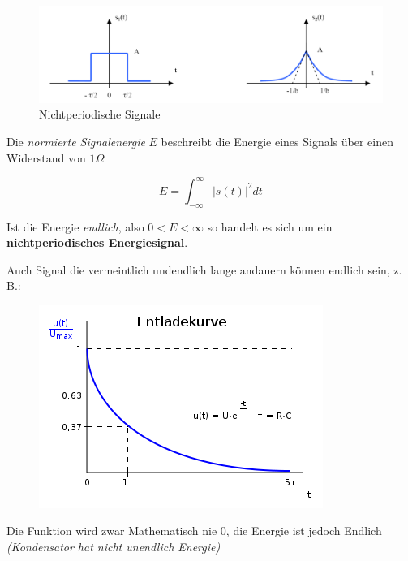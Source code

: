 \documentclass[
  10pt,
  a4paper,
  german]{article}
\numberwithin{equation}{section}
\begin{document}
\begin{figure}[H]

{\centering \includegraphics{images/02_NichtPeriodisch.png}

}

\caption{Nichtperiodische Signale}

\end{figure}

Die \emph{normierte Signalenergie} \(E\) beschreibt die Energie eines
Signals über einen Widerstand von \(1\Omega\)

\[
E=\int_{-\infty}^{\infty}{|s(t)|^2dt}
\]

\begin{tcolorbox}[enhanced jigsaw, toptitle=1mm, breakable, colback=white, opacityback=0, colframe=quarto-callout-caution-color-frame, bottomrule=.15mm, toprule=.15mm, bottomtitle=1mm, opacitybacktitle=0.6, coltitle=black, leftrule=.75mm, left=2mm, colbacktitle=quarto-callout-caution-color!10!white, rightrule=.15mm, titlerule=0mm, title=\textcolor{quarto-callout-caution-color}{\faFire}\hspace{0.5em}{Energiesignal}, arc=.35mm]

Ist die Energie \emph{endlich}, also \(0<E<\infty\) so handelt es sich
um ein \textbf{nichtperiodisches Energiesignal}.

Auch Signal die vermeintlich undendlich lange andauern können endlich
sein, z. B.:

\begin{figure}[H]

{\centering \includegraphics{images/02_Entladekurve.png}

}

\end{figure}

Die Funktion wird zwar Mathematisch nie \(0\), die Energie ist jedoch
Endlich \emph{(Kondensator hat nicht unendlich Energie)}

\end{tcolorbox}
\end{document}
